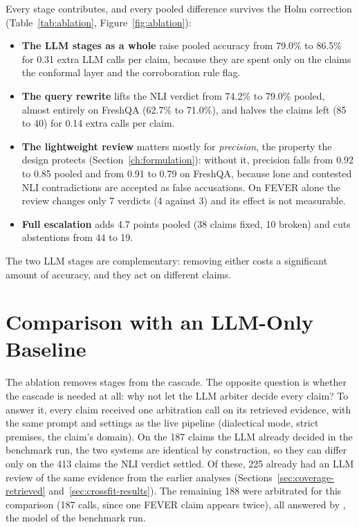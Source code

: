 Every stage contributes, and every pooled difference survives the Holm correction (Table~\ref{tab:ablation}, Figure~\ref{fig:ablation}):
\begin{itemize}[itemsep=0.3em]
  \item \textbf{The LLM stages as a whole} raise pooled accuracy from 79.0\% to 86.5\% for 0.31 extra LLM calls per claim, because they are spent only on the claims the conformal layer and the corroboration rule flag.
  \item \textbf{The query rewrite} lifts the NLI verdict from 74.2\% to 79.0\% pooled, almost entirely on FreshQA (62.7\% to 71.0\%), and halves the claims left \Unk{} (85 to 40) for 0.14 extra calls per claim.
  \item \textbf{The lightweight review} matters mostly for \emph{precision}, the property the design protects (Section~\ref{ch:formulation}): without it, precision falls from 0.92 to 0.85 pooled and from 0.91 to 0.79 on FreshQA, because lone and contested NLI contradictions are accepted as false accusations. On FEVER alone the review changes only 7 verdicts (4 against 3) and its effect is not measurable.
  \item \textbf{Full escalation} adds 4.7 points pooled (38 claims fixed, 10 broken) and cuts abstentions from 44 to 19.
\end{itemize}
The two LLM stages are complementary: removing either costs a significant amount of accuracy, and they act on different claims.

\section{Comparison with an LLM-Only Baseline}
\label{sec:llm-baseline}

The ablation removes stages from the cascade. The opposite question is whether the cascade is needed at all: why not let the LLM arbiter decide every claim? To answer it, every claim received one arbitration call on its retrieved evidence, with the same prompt and settings as the live pipeline (dialectical mode, strict premises, the claim's domain). On the 187 claims the LLM already decided in the benchmark run, the two systems are identical by construction, so they can differ only on the 413 claims the NLI verdict settled. Of these, 225 already had an LLM review of the same evidence from the earlier analyses (Sections~\ref{sec:coverage-retrieved} and~\ref{sec:crossfit-results}). The remaining 188 were arbitrated for this comparison (187 calls, since one FEVER claim appears twice), all answered by , the model of the benchmark run.

